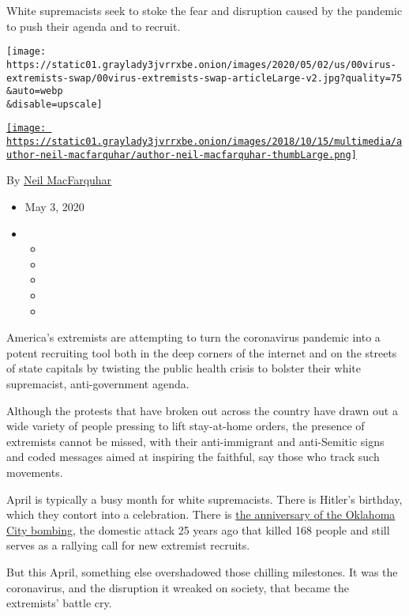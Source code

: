 White supremacists seek to stoke the fear and disruption caused by the
pandemic to push their agenda and to recruit.

\texttt{[image: https://static01.graylady3jvrrxbe.onion/images/2020/05/02/us/00virus-extremists-swap/00virus-extremists-swap-articleLarge-v2.jpg?quality=75\\\&auto=webp\\\&disable=upscale]}

\href{https://www.nytimes3xbfgragh.onion/by/neil-macfarquhar}{\texttt{[image: https://static01.graylady3jvrrxbe.onion/images/2018/10/15/multimedia/author-neil-macfarquhar/author-neil-macfarquhar-thumbLarge.png]}}

By \href{https://www.nytimes3xbfgragh.onion/by/neil-macfarquhar}{Neil
MacFarquhar}

\begin{itemize}
\item
  May 3, 2020
\item
  \begin{itemize}
  \item
  \item
  \item
  \item
  \item
  \end{itemize}
\end{itemize}

America's extremists are attempting to turn the coronavirus pandemic
into a potent recruiting tool both in the deep corners of the internet
and on the streets of state capitals by twisting the public health
crisis to bolster their white supremacist, anti-government agenda.

Although the protests that have broken out across the country have drawn
out a wide variety of people pressing to lift stay-at-home orders, the
presence of extremists cannot be missed, with their anti-immigrant and
anti-Semitic signs and coded messages aimed at inspiring the faithful,
say those who track such movements.

April is typically a busy month for white supremacists. There is
Hitler's birthday, which they contort into a celebration. There is
\href{https://www.nytimes3xbfgragh.onion/2020/04/19/us/Timothy-McVeigh-Oklahoma-City-Bombing-Coronavirus.html}{the
anniversary of the Oklahoma City bombing}, the domestic attack 25 years
ago that killed 168 people and still serves as a rallying call for new
extremist recruits.

But this April, something else overshadowed those chilling milestones.
It was the coronavirus, and the disruption it wreaked on society, that
became the extremists' battle cry.

